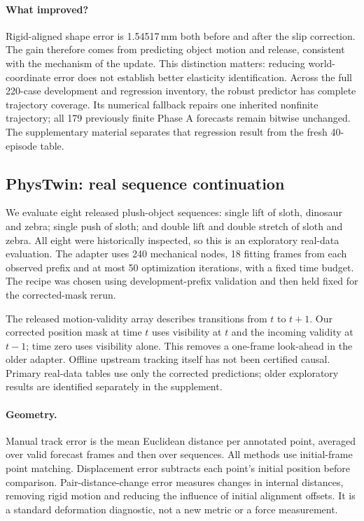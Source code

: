 \documentclass[10pt,twocolumn,letterpaper]{article}
\begin{document}
\paragraph{What improved?}
Rigid-aligned shape error is 1.54517\,mm both before and after the slip correction. The gain therefore comes from predicting object motion and release, consistent with the mechanism of the update. This distinction matters: reducing world-coordinate error does not establish better elasticity identification. Across the full 220-case development and regression inventory, the robust predictor has complete trajectory coverage. Its numerical fallback repairs one inherited nonfinite trajectory; all 179 previously finite Phase A forecasts remain bitwise unchanged. The supplementary material separates that regression result from the fresh 40-episode table.

\subsection{PhysTwin: real sequence continuation}
We evaluate eight released plush-object sequences: single lift of sloth, dinosaur and zebra; single push of sloth; and double lift and double stretch of sloth and zebra. All eight were historically inspected, so this is an exploratory real-data evaluation. The adapter uses 240 mechanical nodes, 18 fitting frames from each observed prefix and at most 50 optimization iterations, with a fixed time budget. The recipe was chosen using development-prefix validation and then held fixed for the corrected-mask rerun.

The released motion-validity array describes transitions from $t$ to $t+1$. Our corrected position mask at time $t$ uses visibility at $t$ and the incoming validity at $t-1$; time zero uses visibility alone. This removes a one-frame look-ahead in the older adapter. Offline upstream tracking itself has not been certified causal. Primary real-data tables use only the corrected predictions; older exploratory results are identified separately in the supplement.

\paragraph{Geometry.}
Manual track error is the mean Euclidean distance per annotated point, averaged over valid forecast frames and then over sequences. All methods use initial-frame point matching. Displacement error subtracts each point's initial position before comparison. Pair-distance-change error measures changes in internal distances, removing rigid motion and reducing the influence of initial alignment offsets. It is a standard deformation diagnostic, not a new metric or a force measurement.
\end{document}
